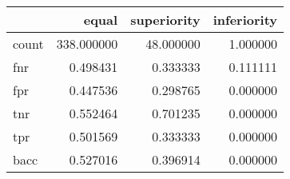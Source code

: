 \begin{tabular}{lrrr}
\toprule
{} &       equal &  superiority &  inferiority \\
\midrule
count &  338.000000 &    48.000000 &     1.000000 \\
fnr   &    0.498431 &     0.333333 &     0.111111 \\
fpr   &    0.447536 &     0.298765 &     0.000000 \\
tnr   &    0.552464 &     0.701235 &     0.000000 \\
tpr   &    0.501569 &     0.333333 &     0.000000 \\
bacc  &    0.527016 &     0.396914 &     0.000000 \\
\bottomrule
\end{tabular}

